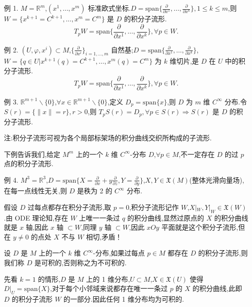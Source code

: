 例 1. $M = \mathbb{R}^m$,$(x^1, \ldots, x^m)$ 标准欧式坐标.$D = \text{span}\{\frac{\partial}{\partial x^1}, \ldots, \frac{\partial}{\partial x^k}\}, 1 \leq k \leq m$,则 $W = \{x^{k+1} = C^{k+1}, \ldots, x^m = C^m\}$ 是 $D$ 的积分子流形.
\[
T_pW = \text{span}\{\frac{\partial}{\partial x^1}, \ldots, \frac{\partial}{\partial x^k}\}, \forall p \in W.
\]

例 2. $(U, \varphi, x^i) \subset M$,$\{\frac{\partial}{\partial x^i}\}_{i=1,\ldots,m}$ 自然基;$D = \text{span}\{\frac{\partial}{\partial x^1}, \ldots, \frac{\partial}{\partial x^k}\}$,$W = \{q \in U|x^{k+1}(q) = C^{k+1}, \ldots, x^m(q) = C^m\}$ 为 $k$ 维切片,是 $D$ 在 $U$ 中的积分子流形.
\[
T_pW = \text{span}\{\frac{\partial}{\partial x^1}, \ldots, \frac{\partial}{\partial x^k}\}, \forall p \in W.
\]

例 3. $\mathbb{R}^{m+1}\backslash \{0\}$,$\forall x \in \mathbb{R}^{m+1}\backslash \{0\}$,定义 $D_p = \text{span}\{x\}$,则 $D$ 为 $m$ 维 $C^\infty$ 分布.令 $S(r) = \{\|x\| = r\}, r > 0$,则 $T_pS(r) = D_p, \forall p \in S(r) \Rightarrow S(r)$ 是 $D$ 的积分子流形.

注:积分子流形可视为各个局部标架场的积分曲线交织所构成的子流形.

下例告诉我们,给定 $M^m$ 上的一个 $k$ 维 $C^\infty$-分布 $D$,$\forall p \in M$,不一定存在 $D$ 的过 $p$ 点的积分子流形.

例 4. $M^3 = \mathbb{R}^3$,$D = \text{span}\{X = \frac{\partial}{\partial x} + y\frac{\partial}{\partial z}, Y = \frac{\partial}{\partial y}\}$,$X, Y \in \mathfrak{X}(M)$(整体光滑向量场),在每一点线性无关,则 $D$ 是秩为 2 的 $C^\infty$ 分布.

假设 $D$ 过每点都存在积分子流形,取 $p = 0$,积分子流形记作 $W$,$X|_W, Y|_W \in \mathfrak{X}(W)$.由 ODE 理论知,存在 $W$ 上唯一一条过 $q$ 的积分曲线,显然过原点的 $X$ 的积分曲线就是 $x$ 轴,因此 $x$ 轴 $\subset W$,同理 $y$ 轴 $\subset W$,因此 $xOy$ 平面就是这个积分子流形,但在 $y \neq 0$ 的点处 $X$ 不与 $W$ 相切,矛盾！

\begin{definition}
设 $D$ 是 $M$ 上的一个 $k$ 维 $C^\infty$-分布,如果过每点 $p \in M$ 都存在 $D$ 的积分子流形,则我们称 $D$ 是可积的,否则称之为不可积的.
\end{definition}

先看 $k = 1$ 的情形,$D$ 是 $M$ 上的 1 维分布,$U \subset M$,$X \in \mathfrak{X}(U)$ 使得 $D|_U = \text{span}\{X\}$,对于每个小邻域来说都存在唯一一条过 $p$ 的 $X$ 的积分曲线,此即 $D$ 的积分子流形 $W$ 的一部分.因此任何 1 维分布均为可积的.

